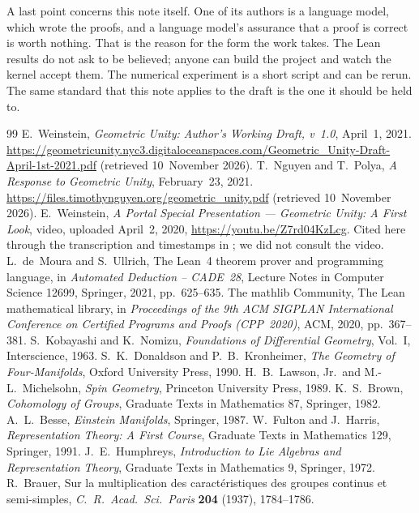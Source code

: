 \documentclass[11pt]{article}
\theoremstyle{remark}
\begin{document}
A last point concerns this note itself. One of its authors is a language model, which wrote the proofs, and a language model's
assurance that a proof is correct is worth nothing. That is the reason for the form the work
takes. The Lean results do not ask to be believed; anyone can build the project and watch the
kernel accept them. The numerical experiment is a short script and can be rerun. The same standard
that this note applies to the draft is the one it should be held to.

\begin{thebibliography}{99}\small
{} E.~Weinstein, \emph{Geometric Unity: Author's Working Draft, v~1.0}, April~1,
2021. \url{https://geometricunity.nyc3.digitaloceanspaces.com/Geometric_Unity-Draft-April-1st-2021.pdf}
(retrieved 10~November 2026).
 T.~Nguyen and T.~Polya, \emph{A Response to Geometric Unity}, February~23, 2021.
\url{https://files.timothynguyen.org/geometric_unity.pdf} (retrieved 10~November 2026).
 E.~Weinstein, \emph{A Portal Special Presentation --- Geometric Unity: A First
Look}, video, uploaded April~2, 2020, \url{https://youtu.be/Z7rd04KzLcg}. Cited here through
the transcription and timestamps in \cite{NP}; we did not consult the video.
 L.~de~Moura and S.~Ullrich, The Lean~4 theorem prover and programming language,
in \emph{Automated Deduction -- CADE~28}, Lecture Notes in Computer Science 12699, Springer,
2021, pp.~625--635.
 The mathlib Community, The Lean mathematical library, in \emph{Proceedings of
the 9th ACM SIGPLAN International Conference on Certified Programs and Proofs (CPP~2020)}, ACM,
2020, pp.~367--381.
 S.~Kobayashi and K.~Nomizu, \emph{Foundations of Differential Geometry}, Vol.~I,
Interscience, 1963.
 S.~K.~Donaldson and P.~B.~Kronheimer, \emph{The Geometry of Four-Manifolds},
Oxford University Press, 1990.
 H.~B.~Lawson, Jr.\ and M.-L.~Michelsohn, \emph{Spin Geometry}, Princeton
University Press, 1989.
 K.~S.~Brown, \emph{Cohomology of Groups}, Graduate Texts in Mathematics 87,
Springer, 1982.
 A.~L.~Besse, \emph{Einstein Manifolds}, Springer, 1987.
 W.~Fulton and J.~Harris, \emph{Representation Theory: A First Course}, Graduate
Texts in Mathematics 129, Springer, 1991.
 J.~E.~Humphreys, \emph{Introduction to Lie Algebras and Representation
Theory}, Graduate Texts in Mathematics 9, Springer, 1972.
 R.~Brauer, Sur la multiplication des caract\'eristiques des groupes continus
et semi-simples, \emph{C.~R.~Acad.\ Sci.\ Paris} \textbf{204} (1937), 1784--1786.

\end{thebibliography}
\end{document}
